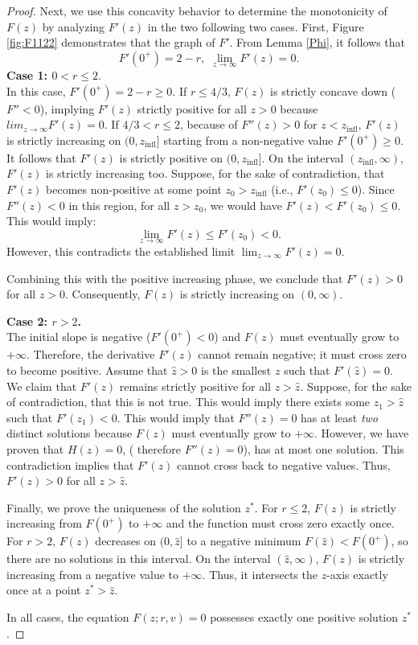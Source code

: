 \documentclass[12pt]{article}
\theoremstyle{definition}
\begin{document}
\begin{proof}
Next, we use this concavity behavior to determine the monotonicity of $F(z)$ by analyzing $F'(z)$ in the two following two cases. First, Figure \ref{fig:F1122} demonstrates that the graph of $F'$. From Lemma \ref{Phi}, it follows that 
\[
F'(0^+)=2-r, \,\,  \lim_{z \to \infty} F'(z) = 0.
\]
\textbf{Case 1: $0 < r \le 2$}. \\
In this case, $F'(0^+) = 2 - r \ge 0$. If $r \le 4/3$, $F(z)$ is strictly concave down ($F''<0$), implying $F'(z)$ strictly positive for all $z>0$ because $lim_{z \to \infty} F'(z) = 0.$  If $4/3 < r \le 2$, because of $F''(z) > 0$ for $z < z_{\text{infl}}$, $F'(z)$ is strictly increasing on $(0, z_{\text{infl}}]$ starting from a non-negative value $F'(0^+) \ge 0$. It follows that $F'(z)$ is strictly positive on $(0, z_{\text{infl}}]$. On the interval $(z_{\text{infl}}, \infty)$, $F'(z)$ is strictly increasing too. Suppose, for the sake of contradiction, that $F'(z)$ becomes non-positive at some point $z_0 > z_{\text{infl}}$ (i.e., $F'(z_0) \le 0$). Since $F''(z)<0$ in this region, for all $z > z_0$, we would have $F'(z) < F'(z_0) \le 0$. This would imply:
\[
\lim_{z \to \infty} F'(z) \le F'(z_0) < 0.
\]
However, this contradicts the established limit $\lim_{z \to \infty} F'(z) = 0$.

Combining this with the positive increasing phase, we conclude that $F'(z) > 0$ for all $z > 0$. Consequently, $F(z)$ is strictly increasing on $(0, \infty)$.

\textbf{Case 2: $r > 2$.} \\
The initial slope is negative ($F'(0^+) < 0$) and $F(z)$ must eventually grow to $+\infty$. Therefore, the derivative $F'(z)$ cannot remain negative; it must cross zero to become positive. Assume that $\hat{z}>0$ is the smallest $z$ such that $F'(\hat{z})=0.$  We claim that $F'(z)$ remains strictly positive for all $z > \hat{z}$. Suppose, for the sake of contradiction, that this is not true. This would imply there exists some $z_1 > \hat{z}$ such that $F'(z_1) < 0$. This would imply that $F''(z) = 0$ has at least \textit{two} distinct solutions because $F(z)$ must eventually grow to $+\infty$. However, we have proven that $H(z)=0$, ( therefore $F''(z) = 0$), has at most one solution. This contradiction implies that $F'(z)$ cannot cross back to negative values. Thus, $F'(z) > 0$ for all $z > \hat{z}$.

Finally, we prove the uniqueness of the solution $z^*$.
For $r \le 2$, $F(z)$ is strictly increasing from $F(0^+)$ to $+\infty$ and the function must cross zero exactly once.
For $r > 2$, $F(z)$ decreases on $(0, \hat{z}]$ to a negative minimum $F(\hat{z}) < F(0^+)$, so there are no solutions in this interval. On the interval $(\hat{z}, \infty)$, $F(z)$ is strictly increasing from a negative value to $+\infty$. Thus, it intersects the $z$-axis exactly once at a point $z^* > \hat{z}$.

In all cases, the equation $F(z;r,v)=0$ possesses exactly one positive solution $z^*$.
\end{proof}
\end{document}
